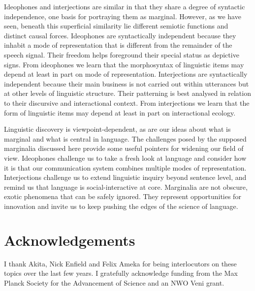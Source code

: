 \documentclass[output=paper]{langsci/langscibook}
\begin{document}
    Ideophones and interjections are similar in that they share a degree of syntactic independence, one basis for portraying them as marginal. However, as we have seen, beneath this superficial similarity lie different semiotic functions and distinct causal forces. Ideophones are syntactically independent because they inhabit a mode of representation that is different from the remainder of the speech signal. Their freedom helps foreground their special status as depictive signs. From ideophones we learn that the morphosyntax of linguistic items may depend at least in part on mode of representation. Interjections are syntactically independent because their main business is not carried out within utterances but at other levels of linguistic structure. Their patterning is best analysed in relation to their discursive and interactional context. From interjections we learn that the form of linguistic items may depend at least in part on interactional ecology.



Linguistic discovery is viewpoint-dependent, as are our ideas about what is marginal and what is central in language. The challenges posed by the supposed marginalia discussed here provide some useful pointers for widening our field of view. Ideophones challenge us to take a fresh look at language and consider how it is that our communication system combines multiple modes of representation. Interjections challenge us to extend linguistic inquiry beyond sentence level, and remind us that language is social-interactive at core. Marginalia are not obscure, exotic phenomena that can be safely ignored. They represent opportunities for innovation and invite us to keep pushing the edges of the science of language.


\section*{Acknowledgements}

I thank  Akita, Nick Enfield and Felix Ameka for being interlocutors on these topics over the last few years. I gratefully acknowledge funding from the Max Planck Society for the Advancement of Science and an NWO Veni grant. 


{\sloppy
\printbibliography[heading=subbibliography,notkeyword=this]
}
\end{document}

